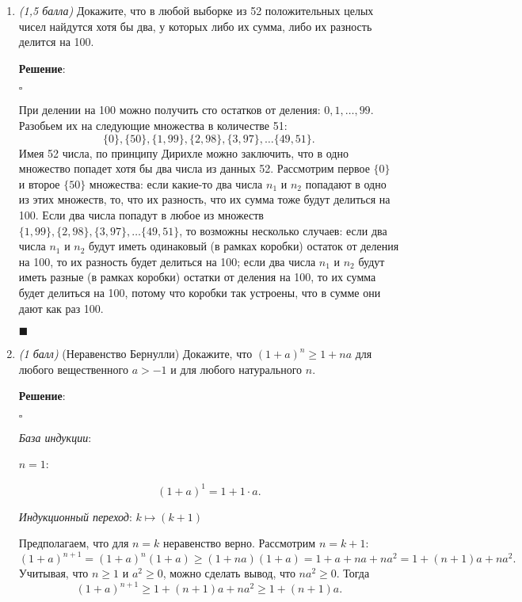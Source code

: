 \documentclass{article}
\begin{document}
\begin{enumerate}
        \item \textit{(1,5 балла)} Докажите, что в любой выборке из 52 положительных целых чисел найдутся хотя бы два, у которых либо их сумма, либо их разность делится на 100.
        
        \textbf{Решение}:

        $\square$

        При делении на 100 можно получить сто остатков от деления: $0, 1, \ldots, 99$. Разобьем их на следующие множества в количестве 51:
        $$\{0\}, \{50\}, \{1, 99\}, \{2, 98\}, \{3, 97\}, \ldots \{49, 51\}.$$
        Имея 52 числа, по принципу Дирихле можно заключить, что в одно множество попадет хотя бы два числа из данных 52. Рассмотрим первое $\{0\}$ и второе $\{50\}$ множества: если какие-то два числа $n_1$ и $n_2$ попадают в одно из этих множеств, то, что их разность, что их сумма тоже будут делиться на 100. Если два числа попадут в любое из множеств $\{1, 99\}, \{2, 98\}, \{3, 97\}, \ldots \{49, 51\}$, то возможны несколько случаев: если два числа $n_1$ и $n_2$ будут иметь одинаковый (в рамках коробки) остаток от деления на 100, то их разность будет делиться на 100; если два числа $n_1$ и $n_2$ будут иметь разные (в рамках коробки) остатки от деления на 100, то их сумма будет делиться на 100, потому что коробки так устроены, что в сумме они дают как раз 100.
        \begin{flushright}
            $\blacksquare$
        \end{flushright}

        \item \textit{(1 балл)} (Неравенство Бернулли) Докажите, что $(1+a)^n\geq1+na$ для любого вещественного $a>-1$ и для любого натурального $n$.
        
        \textbf{Решение}:

        $\square$

        \textit{База индукции}:
        
        $n=1$: 

        $$(1+a)^1=1+1\cdot a.$$

        \textit{Индукционный переход}: $k\mapsto(k+1)$

        Предполагаем, что для $n=k$ неравенство верно. Рассмотрим $n=k+1$:
        \begin{equation}
            (1+a)^{n+1}=(1+a)^n(1+a)\geq(1+na)(1+a)=1+a+na+na^2=1+(n+1)a+na^2.
        \end{equation}
        Учитывая, что $n\geq1$ и $a^2\geq0$, можно сделать вывод, что $na^2\geq0$. Тогда
        \begin{equation}
            (1+a)^{n+1}\geq1+(n+1)a+na^2\geq1+(n+1)a.
        \end{equation}


\end{enumerate}
\end{document}
